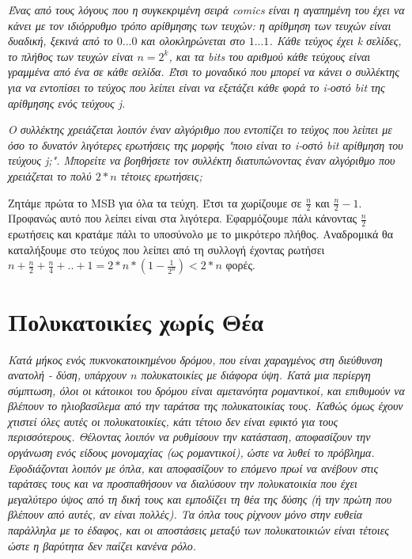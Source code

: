 \documentclass[a4paper,10pt]{article} \usepackage{anysize}
\begin{document}
\textit{Ένας από τους λόγους που η συγκεκριμένη σειρά comics είναι η αγαπημένη του
έχει να κάνει με τον ιδιόρρυθμο τρόπο αρίθμησης των τευχών: η αρίθμηση των
τευχών είναι δυαδική, ξεκινά από το $0...0$ και ολοκληρώνεται στο $1...1$.
Κάθε τεύχος έχει k σελίδες, το πλήθος των τευχών είναι $n=2^k$, και τα bits
του αριθμού κάθε τεύχους είναι γραμμένα από ένα σε κάθε σελίδα. Έτσι το
μοναδικό που μπορεί να κάνει ο συλλέκτης για να εντοπίσει το τεύχος που λείπει
είναι να εξετάζει κάθε φορά το i-οστό bit της αρίθμησης ενός τεύχους j.}

\textit{Ο συλλέκτης χρειάζεται λοιπόν έναν αλγόριθμο που εντοπίζει το τεύχος που
λείπει με όσο το δυνατόν λιγότερες ερωτήσεις της μορφής "ποιο είναι το i-οστό
bit αρίθμηση του τεύχους j;". Μπορείτε να βοηθήσετε τον συλλέκτη διατυπώνοντας
έναν αλγόριθμο που χρειάζεται το πολύ $2*n$ τέτοιες ερωτήσεις;}\vspace{0.4cm}

Ζητάμε πρώτα το MSB για όλα τα τεύχη. Έτσι τα χωρίζουμε σε $\frac{n}{2}$ και
$\frac{n}{2}-1$. Προφανώς αυτό που λείπει είναι στα λιγότερα. Εφαρμόζουμε πάλι
κάνοντας $\frac{n}{2}$ ερωτήσεις και κρατάμε πάλι το υποσύνολο με το μικρότερο
πλήθος. Αναδρομικά θα καταλήξουμε στο τεύχος που λείπει από τη συλλογή έχοντας
ρωτήσει $n+\frac{n}{2}+\frac{n}{4}+..+1=2*n*(1-\frac{1}{2^n}) < 2*n$ φορές.
\section{Πολυκατοικίες χωρίς Θέα}
\textit{Κατά μήκος ενός πυκνοκατοικημένου δρόμου, που είναι χαραγμένος στη
διεύθυνση ανατολή - δύση, υπάρχουν $n$ πολυκατοικίες με διάφορα ύψη. Κατά μια
περίεργη σύμπτωση, όλοι οι κάτοικοι του δρόμου είναι αμετανόητα ρομαντικοί,
και επιθυμούν να βλέπουν το ηλιοβασίλεμα από την ταράτσα της πολυκατοικίας
τους. Καθώς όμως έχουν χτιστεί όλες αυτές οι πολυκατοικίες, κάτι τέτοιο δεν
είναι εφικτό για τους περισσότερους. Θέλοντας λοιπόν να ρυθμίσουν την
κατάσταση, αποφασίζουν την οργάνωση ενός είδους μονομαχίας (ως ρομαντικοί),
ώστε να λυθεί το πρόβλημα. Εφοδιάζονται λοιπόν με όπλα, και αποφασίζουν το
επόμενο πρωί να ανέβουν στις ταράτσες τους και να προσπαθήσουν να διαλύσουν
την πολυκατοικία που έχει μεγαλύτερο ύψος από τη δική τους και εμποδίζει τη θέα
της δύσης (ή την πρώτη που βλέπουν από αυτές, αν είναι πολλές). Τα όπλα τους
ρίχνουν μόνο στην ευθεία παράλληλα με το έδαφος, και οι αποστάσεις μεταξύ των
πολυκατοικιών είναι τέτοιες ώστε η βαρύτητα δεν παίζει κανένα ρόλο.}
\end{document}

